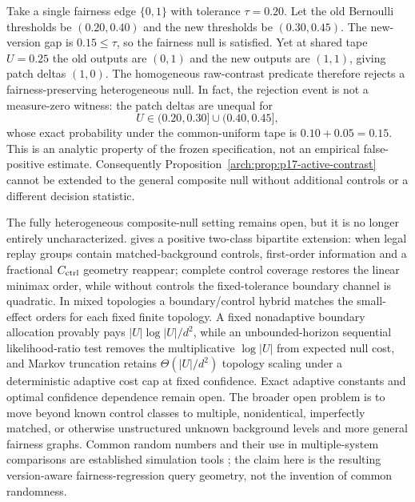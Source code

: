 \begin{remark}
\label{arch:rem:p17-heterogeneous-scope}
Take a single fairness edge $\{0,1\}$ with tolerance $\tau=0.20$. Let the
old Bernoulli thresholds be $(0.20,0.40)$ and the new thresholds be
$(0.30,0.45)$. The new-version gap is $0.15\le\tau$, so the fairness null is
satisfied. Yet at shared tape $U=0.25$ the old outputs are $(0,1)$ and the new
outputs are $(1,1)$, giving patch deltas $(1,0)$. The homogeneous raw-contrast
predicate therefore rejects a fairness-preserving heterogeneous null.
In fact, the rejection event is not a measure-zero witness: the patch deltas
are unequal for
\begin{equation}\label{eq:appendix-07-open-problems-014}
U\in(0.20,0.30]\cup(0.40,0.45],
\end{equation}
whose exact probability under the common-uniform tape is $0.10+0.05=0.15$.
This is an analytic property of the frozen specification, not an empirical
false-positive estimate. Consequently Proposition~\ref{arch:prop:p17-active-contrast} cannot be extended to
the general composite null without additional controls or a different decision
statistic.
\end{remark}

The fully heterogeneous composite-null setting remains open, but it is no
longer entirely uncharacterized.   gives a positive
two-class bipartite extension: when legal replay groups contain
matched-background controls, first-order information and a fractional
$C_{\rm ctrl}$ geometry reappear; complete control coverage restores the linear
minimax order, while without controls the fixed-tolerance boundary channel is
quadratic.  In mixed topologies a boundary/control hybrid matches the
small-effect orders for each fixed finite topology.  A fixed nonadaptive
boundary allocation provably pays $|U|\log |U|/d^2$, while an unbounded-horizon
sequential likelihood-ratio test removes the multiplicative $\log |U|$ from
expected null cost, and Markov truncation retains $\Theta(|U|/d^2)$ topology
scaling under a deterministic adaptive cost cap at fixed confidence.  Exact
adaptive constants and optimal confidence dependence remain open.  The broader
open problem is to move beyond known control classes to multiple, nonidentical,
imperfectly matched, or otherwise unstructured unknown background levels and
more general fairness graphs.  Common random
numbers and their use in multiple-system
comparisons are established simulation tools
\cite{GlassermanYao1992,YangNelson1991}; the claim here is the resulting
version-aware fairness-regression query geometry, not the invention of common
randomness.

